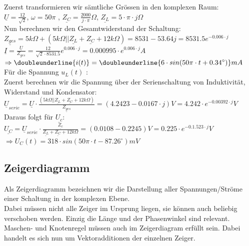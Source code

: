 \newpage

\beginip
Zuerst transformieren wir sämtliche Grössen in den komplexen Raum: \\
$\displaystyle \underline{U} = \frac{12}{\sqrt{2}} $, $\displaystyle \omega = 50 \pi $ , $\displaystyle \underline{Z_C} = \frac{2000}{j \cdot \pi} \Omega $, $\displaystyle \underline{Z_L} = 5 \cdot \pi \cdot j \Omega $ \\
Nun berechnen wir den Gesamtwiderstand der Schaltung:\\
$\displaystyle \underline{Z_{ges}} = 5k\Omega + (5k\Omega || \underline{Z_L} + \underline{Z_C} + 12k\Omega) = 8531 - 53.64j = 8531.5 e^{-0.006\cdot j}  $ \\
$\displaystyle  \underline{I} = \frac{\underline{U}}{Z_{ges}} = \frac{12}{\sqrt{2} \cdot 8531.5} e^{0.006\cdot j} = 0.000995 \cdot e^{0.006\cdot j} A $ \\
$\displaystyle \Rightarrow \doubleunderline{i(t)} = \doubleunderline{6 \cdot sin(50\pi \cdot t + 0.34^\circ)} mA $  \\
Für die Spannung $\displaystyle u_L(t) $ : \\
Zuerst berechnen wir die Spannung über der Serienschaltung von Induktivität, Widerstand und Kondensator: \\
$\displaystyle \underline{U}_{serie} = \underline{U} \cdot \frac{(5k\Omega || \underline{Z_L} + \underline{Z_C} + 12k\Omega)}{\underline{Z_{ges}}} = (4.2423 - 0.0167 \cdot j) V = 4.242 \cdot e^{-0.00392 \cdot j}V $ \\
Daraus folgt für $\displaystyle \underline{U_c} $: \\
$\displaystyle \underline{U_C} = \underline{U}_{serie} \cdot \frac{\underline{Z_c}}{\underline{Z_L} + \underline{Z_C} + 12k\Omega} = (0.0108 - 0.2245)V = 0.225 \cdot e^{-0.1.523 \cdot j}V $ \\
$\displaystyle  \Rightarrow U_C(t) = 318 \cdot sin(50\pi \cdot t - 87.26^\circ) mV $
\iend


\newpage

\subsection{Zeigerdiagramm}
Als Zeigerdiagramm bezeichnen wir die Darstellung aller Spannungen/Ströme einer Schaltung in der komplexen Ebene. \\
Dabei müssen nicht alle Zeiger im Ursprung liegen, sie können auch beliebig verschoben werden. Einzig die Länge und der Phasenwinkel sind relevant. \\
Maschen- und Knotenregel müssen auch im Zeigerdiagram erfüllt sein. Dabei handelt es sich nun um Vektoradditionen der einzelnen Zeiger. \\

